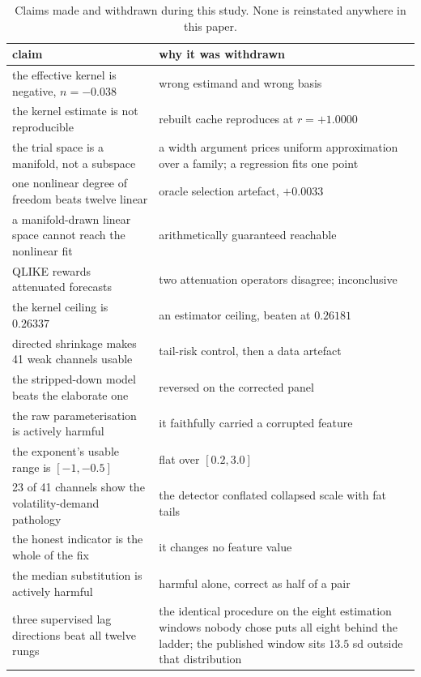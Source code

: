 \begin{table}[t]
\centering
\caption{Claims made and withdrawn during this study. None is reinstated
anywhere in this paper.}
\label{tab:ledger}
\small
\begin{tabular}{p{}p{}}
\toprule
claim & why it was withdrawn \\
\midrule
the effective kernel is negative, $n = -0.038$ & wrong estimand and wrong basis \\
the kernel estimate is not reproducible & rebuilt cache reproduces at $r = +1.0000$ \\
the trial space is a manifold, not a subspace & a width argument prices uniform approximation over a family; a regression fits one point \\
one nonlinear degree of freedom beats twelve linear & oracle selection artefact, $+0.0033$ \\
a manifold-drawn linear space cannot reach the nonlinear fit & arithmetically guaranteed reachable \\
QLIKE rewards attenuated forecasts & two attenuation operators disagree; inconclusive \\
the kernel ceiling is $0.26337$ & an estimator ceiling, beaten at $0.26181$ \\
directed shrinkage makes 41 weak channels usable & tail-risk control, then a data artefact \\
the stripped-down model beats the elaborate one & reversed on the corrected panel \\
the raw parameterisation is actively harmful & it faithfully carried a corrupted feature \\
the exponent's usable range is $[-1, -0.5]$ & flat over $[0.2, 3.0]$ \\
23 of 41 channels show the volatility-demand pathology & the detector conflated collapsed scale with fat tails \\
the honest indicator is the whole of the fix & it changes no feature value \\
the median substitution is actively harmful & harmful alone, correct as half of a pair \\
three supervised lag directions beat all twelve rungs & the identical procedure on the eight estimation windows nobody chose puts all eight behind the ladder; the published window sits $13.5$ sd outside that distribution \\
\bottomrule
\end{tabular}
\end{table}

